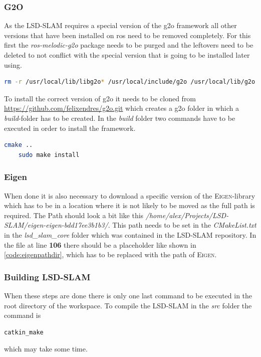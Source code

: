 \subsubsection{G2O}\label{ref:g2o}
As the LSD-SLAM requires a special version of the \gls{g2o} framework all other versions that have been installed on \gls{ros} need to be removed completely. For this first the \textit{ros-melodic-g2o} package needs to be purged and the leftovers need to be deleted to not conflict with the special version that is going to be installed later using.\newline
\begin{lstlisting}[language=bash, caption={Removing leftover from \gls{g2o}}]
    rm -r /usr/local/lib/libg2o* /usr/local/include/g2o /usr/local/lib/g2o /usr/local/bin/g2o*
\end{lstlisting}

To install the correct version of \gls{g2o} it needs to be cloned from \url{https://github.com/felixendres/g2o.git} which creates a g2o folder in which a \textit{build}-folder has to be created. In the \textit{build} folder two commands have to be executed in order to install the framework.\newline
\begin{lstlisting}[language=bash]
    cmake ..
    sudo make install
\end{lstlisting}

\subsubsection{Eigen}\label{ref:eigen}
When done it is also necessary to download a specific version of the \textsc{Eigen}-library which has to be in a location where it is not likely to be moved as the full path is required. The Path should look a bit like this \textit{/home/alex/Projects/LSD-SLAM/eigen-eigen-bdd17ee3b1b3/}. This path needs to be set in the \textit{CMakeList.txt} in the \textit{lsd\_slam\_core} folder which was contained in the LSD-SLAM repository. In the file at line \textbf{106} there should be a placeholder like shown in \ref{code:eigenpathdir}, which has to be replaced with the path of \textsc{Eigen}.\newline


\subsubsection{Building LSD-SLAM}\label{ref:buildinglsdslam}
When these steps are done there is only one last command to be executed in the root directory of the workspace. To compile the LSD-SLAM in the \textit{src} folder the command is \newline
\begin{lstlisting}[language=bash]
    catkin_make
\end{lstlisting}
which may take some time. 


